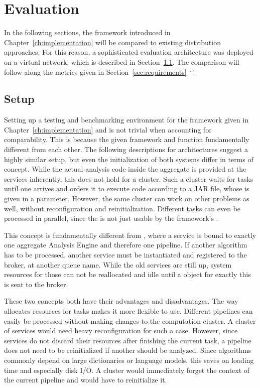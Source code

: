 \chapter{Evaluation}
\label{ch:evaluation}
In the following sections, the framework introduced in Chapter~\ref{ch:implementation} will be compared to existing \uima{} distribution approaches. For this reason, a sophisticated evaluation architecture was deployed on a virtual network, which is described in Section~\ref{sec:setup}. The comparison will follow along the metrics given in Section~\ref{sec:requirements}~`'.


\section{Setup}
\label{sec:setup}

Setting up a testing and benchmarking environment for the framework given in Chapter~\ref{ch:implementation} and \uimaas{} is not trivial when accounting for comparability. This is because the given framework and \uimaas{} function fundamentally different from each other. The following descriptions for \docker{} architectures suggest a highly similar setup, but even the initialization of both systems differ in terms of concept. While the actual analysis code inside the aggregate \anen{} is provided at the \uimaas{} services inherently, this does not hold for a \spark{} cluster. Such a \spark{} cluster waits for tasks until one arrives and orders it to execute code according to a JAR file, whose \URL{} is given in a parameter. However, the same cluster can work on other problems as well, without reconfiguration and reinitialization. Different tasks can even be processed in parallel, since the \spark{} is not just usable by the framework's \api{}.

This concept is fundamentally different from \uimaas{}, where a service is bound to exactly one aggregate Analysis Engine and therefore one pipeline. If another \nlp{} algorithm has to be processed, another \uimaas{} service must be instantiated and registered to the broker, at another queue name. While the old services are still up, system resources for those can not be reallocated and idle until a \cas{} object for exactly this \anen{} is sent to the broker. 

These two concepts both have their advantages and disadvantages. The way \spark{} allocates resources for tasks makes it more flexible to use. Different pipelines can easily be processed without making changes to the computation cluster. A cluster of \uimaas{} services would need heavy reconfiguration for such a case. However, since \uimaas{} services do not discard their resources after finishing the current task, a pipeline does not need to be reinitialized if another \cas{} should be analyzed. Since \nlp{} algorithms commonly depend on large dictionaries or language models, this saves on loading time and especially disk I/O. A \spark{} cluster would immediately forget the context of the current pipeline and would have to reinitialize it.


